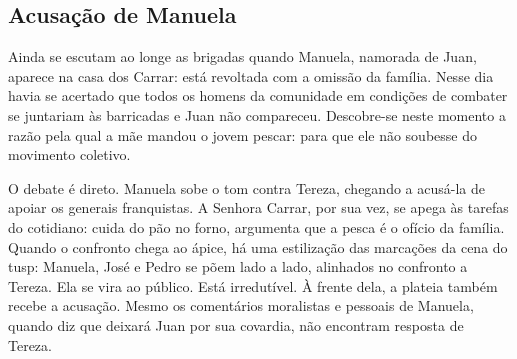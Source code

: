 





\page

\subsection{Acusação de Manuela}

Ainda se escutam ao longe as brigadas quando Manuela, namorada de Juan,
aparece na casa dos Carrar: está revoltada com a omissão da família.
Nesse dia havia se acertado que todos os homens da comunidade em
condições de combater se juntariam às barricadas e Juan não compareceu.
Descobre-se neste momento a razão pela qual a mãe mandou o jovem pescar:
para que ele não soubesse do movimento coletivo.

O debate é direto. Manuela sobe o tom contra Tereza, chegando a acusá-la
de apoiar os generais franquistas. A Senhora Carrar, por sua vez, se
apega às tarefas do cotidiano: cuida do pão no forno, argumenta que a
pesca é o ofício da família. Quando o confronto chega ao ápice, há uma
estilização das marcações da cena do {\sc tusp}: Manuela, José e Pedro se põem
lado a lado, alinhados no confronto a Tereza. Ela se vira ao público.
Está irredutível. À frente dela, a plateia também recebe a acusação.
Mesmo os comentários moralistas e pessoais de Manuela, quando diz que
deixará Juan por sua covardia, não encontram resposta de Tereza.




